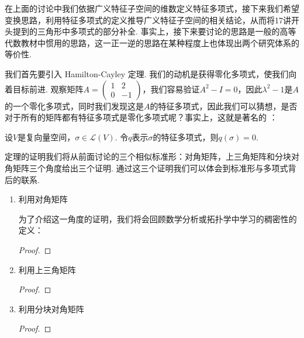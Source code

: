在上面的讨论中我们依据广义特征子空间的维数定义特征多项式，接下来我们希望变换思路，利用特征多项式的定义推导广义特征子空间的相关结论，从而将17讲开头提到的三角形中多项式的部分补全. 事实上，接下来要讨论的思路是一般的高等代数教材中惯用的思路，这一正一逆的思路在某种程度上也体现出两个研究体系的等价性.

我们首先要引入 Hamilton-Cayley 定理. 我们的动机是获得零化多项式，使我们向着目标前进. 观察矩阵$A=\begin{pmatrix}
        1 & 2 \\ 0 & -1
    \end{pmatrix}$，我们容易验证$A^2-I=0$，因此$\lambda^2-1$是$A$的一个零化多项式，同时我们发现这是$A$的特征多项式，因此我们可以猜想，是否对于所有的矩阵都有特征多项式是零化多项式呢？事实上，这就是著名的 ：
\begin{theorem} \label{thm:21:HC} 
    设$V$是复向量空间，$\sigma\in \mathcal{L}(V)$. 令$q$表示$\sigma$的特征多项式，则$q(\sigma)=0$.
\end{theorem}
定理的证明我们将从前面讨论的三个相似标准形：对角矩阵，上三角矩阵和分块对角矩阵三个角度给出三个证明. 通过这三个证明我们可以体会到标准形与多项式背后的联系.

\begin{enumerate}
    \item 利用对角矩阵

          为了介绍这一角度的证明，我们将会回顾数学分析或拓扑学中学习的稠密性的定义：
          \begin{definition}

          \end{definition}

          \begin{lemma}

          \end{lemma}

          \begin{proof}

          \end{proof}

    \item 利用上三角矩阵

          \begin{proof}

          \end{proof}

    \item 利用分块对角矩阵

          \begin{proof}

          \end{proof}
\end{enumerate}

